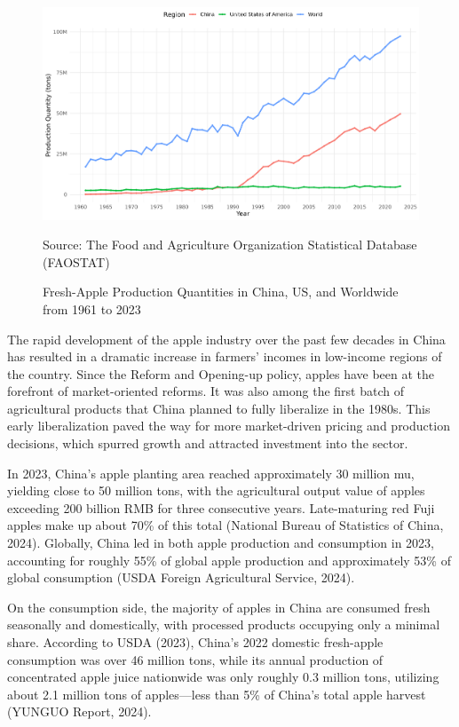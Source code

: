 \begin{figure}[hpt]
    \centering
        \caption{Fresh-Apple Production Quantities in China, US, and Worldwide from 1961 to 2023}
    \includegraphics[width=\linewidth]{figures/production_China_US_world.png}
    \label{fig: production quantity}
    \begin{tablenotes}
    \footnotesize
    \item Source: The Food and Agriculture Organization Statistical Database (FAOSTAT)
    \end{tablenotes}
\end{figure}

The rapid development of the apple industry over the past few decades in China has resulted in a dramatic increase in farmers' incomes in low-income regions of the country. Since the Reform and Opening-up policy, apples have been at the forefront of market-oriented reforms. It was also among the first batch of agricultural products that China planned to fully liberalize in the 1980s. This early liberalization paved the way for more market-driven pricing and production decisions, which spurred growth and attracted investment into the sector.

In 2023, China's apple planting area reached approximately 30 million mu, yielding close to 50 million tons, with the agricultural output value of apples exceeding 200 billion RMB for three consecutive years. Late-maturing red Fuji apples make up about 70\% of this total (National Bureau of Statistics of China, 2024). Globally, China led in both apple production and consumption in 2023, accounting for roughly 55\% of global apple production and approximately 53\% of global consumption (USDA Foreign Agricultural Service, 2024).

On the consumption side, the majority of apples in China are consumed fresh seasonally and domestically, with processed products occupying only a minimal share. According to USDA (2023), China's 2022 domestic fresh-apple consumption was over 46 million tons, while its annual production of concentrated apple juice nationwide was only roughly 0.3 million tons, utilizing about 2.1 million tons of apples—less than 5\% of China's total apple harvest (YUNGUO Report, 2024).

